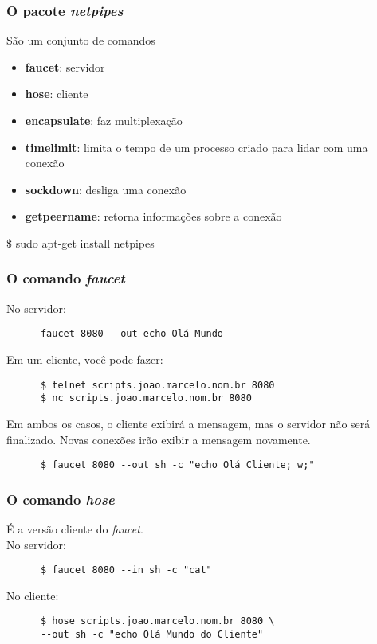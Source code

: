 \documentclass{beamer}
\begin{document}
   \begin{frame}
      \frametitle{O pacote \textit{netpipes}}
      São um conjunto de comandos 
      \begin{itemize}
         \item \textbf{faucet}: servidor
	 \item \textbf{hose}: cliente
	 \item \textbf{encapsulate}: faz multiplexação
	 \item \textbf{timelimit}: limita o tempo de um processo criado para lidar com uma conexão
	 \item \textbf{sockdown}: desliga uma conexão
	 \item \textbf{getpeername}: retorna informações sobre a conexão
      \end{itemize}
      \$ sudo apt-get install netpipes
   \end{frame}

   \begin{frame}[fragile]
      \frametitle{O comando \textit{faucet}}
      No servidor:  
      \begin{verbatim}
      faucet 8080 --out echo Olá Mundo
      \end{verbatim}
      Em um cliente, você pode fazer: 
      \begin{verbatim}
      $ telnet scripts.joao.marcelo.nom.br 8080 
      $ nc scripts.joao.marcelo.nom.br 8080
      \end{verbatim}
      Em ambos os casos, o cliente exibirá a mensagem, mas o servidor não será finalizado. Novas conexões irão exibir a mensagem novamente. 
      \begin{verbatim}
      $ faucet 8080 --out sh -c "echo Olá Cliente; w;"
      \end{verbatim}
\end{frame}

   \begin{frame}[fragile]
      \frametitle{O comando \textit{hose}}
      É a versão cliente do \textit{faucet}. \\ 
      No servidor: 
      \begin{verbatim}
      $ faucet 8080 --in sh -c "cat" 
      \end{verbatim} 
      No cliente: 
      \begin{verbatim}
      $ hose scripts.joao.marcelo.nom.br 8080 \
      --out sh -c "echo Olá Mundo do Cliente"
      \end{verbatim}
\end{frame}
\end{document}
